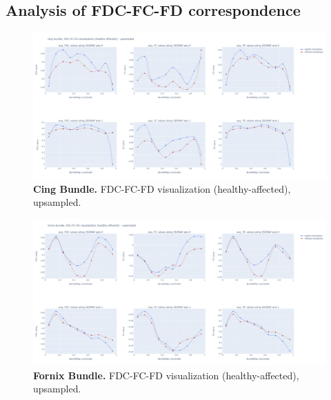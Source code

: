 \documentclass[thesis.tex]{subfiles}
\begin{document}
\subsection{Analysis of FDC-FC-FD correspondence}
\begin{figure}
    \centering
  \includegraphics[width=24cm]{thesis_radomskyi/images/cing bundle, FDC-FC-FD visualization (healthy-affected) - upsampled.png}
    \caption{\textbf{Cing Bundle.} FDC-FC-FD visualization (healthy-affected), upsampled.}
    \label{fig:cing-bundle-fdc-fc-fd}
\end{figure}

\begin{figure}
    \centering
  \includegraphics[width=24cm]{thesis_radomskyi/images/fornix bundle, FDC-FC-FD visualization (healthy-affected) - upsampled.png}
    \caption{\textbf{Fornix Bundle.} FDC-FC-FD visualization (healthy-affected), upsampled.}
    \label{fig:fornix-bundle-fdc-fc-fd}
\end{figure}
\end{document}
